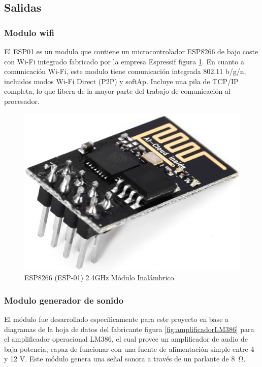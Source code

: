 \subsection{Salidas}
\subsubsection{Modulo wifi}
El ESP01\citep{esp01} es un modulo que contiene un microcontrolador ESP8266\citep{esp8266} de bajo coste con Wi-Fi integrado fabricado por la empresa Espressif\citep{espressif} figura \ref{fig:esp01}. En cuanto a comunicación Wi-Fi, este modulo tiene comunicación integrada 802.11 b/g/n, incluidos modos Wi-Fi Direct (P2P)\citep{wifiDirect} y softAp\citep{softAp}. Incluye una pila de TCP/IP completa, lo que libera de la mayor parte del trabajo de comunicación al procesador.

\begin{figure}[h]
	\centering
	\includegraphics[scale=.2]{./Figures/esp01.pdf}
	\caption{ESP8266 (ESP-01) 2.4GHz Módulo Inalámbrico.}
	\label{fig:esp01}
\end{figure}

\subsubsection{Modulo generador de sonido}
El módulo fue desarrollado específicamente para este proyecto en base a diagramas de la hoja de datos del fabricante figura \ref{fig:amplificadorLM386} para el amplificador operacional LM386\cite{dsLm386}, el cual provee un amplificador de audio de baja potencia, capaz de funcionar con una fuente de alimentación simple entre 4 y 12 V. Este módulo genera una señal sonora a través de un parlante de \SI{8}{\ohm}.

